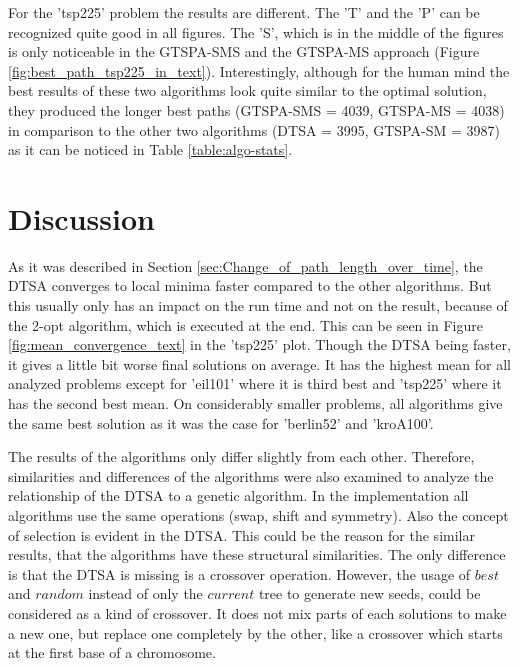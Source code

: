 \documentclass[12pt]{article}
\theoremstyle{plain}
\theoremstyle{definition}
\theoremstyle{remark}
\begin{document}
For the 'tsp225' problem the results are different. The 'T' and the 'P' can be recognized quite good in all figures.
The 'S', which is in the middle of the figures is only noticeable in the GTSPA-SMS and the GTSPA-MS approach (Figure \ref{fig:best_path_tsp225_in_text}).
Interestingly, although for the human mind the best results of these two algorithms look quite similar to the optimal solution, they produced the longer best paths (GTSPA-SMS = 4039, GTSPA-MS = 4038) in comparison to the other two algorithms (DTSA = 3995, GTSPA-SM = 3987) as it can be noticed in Table \ref{table:algo-stats}.

\section{Discussion}
\label{sec:discussion}

As it was described in Section \ref{sec:Change_of_path_length_over_time}, the DTSA converges to local minima faster compared to the other algorithms.
But this usually only has an impact on the run time and not on the result, because of the 2-opt algorithm, which is executed at the end.
This can be seen in Figure \ref{fig:mean_convergence_text} in the 'tsp225' plot.
Though the DTSA being faster, it gives a little bit worse final solutions on average.
It has the highest mean for all analyzed problems except for 'eil101' where it is third best and 'tsp225' where it has the second best mean.
On considerably smaller problems, all algorithms give the same best solution as it was the case for 'berlin52' and 'kroA100'.

The results of the algorithms only differ slightly from each other.
Therefore, similarities and differences of the algorithms were also examined to analyze the relationship of the DTSA to a genetic algorithm.
In the implementation all algorithms use the same operations (swap, shift and symmetry).
Also the concept of selection is evident in the DTSA.
This could be the reason for the similar results, that the algorithms have these structural similarities.
The only difference is that the DTSA is missing is a crossover operation.
However, the usage of $best$ and $random$ instead of only the $current$ tree to generate new seeds, could be considered as a kind of crossover.
It does not mix parts of each solutions to make a new one, but replace one completely by the other, like a crossover which starts at the first base of a chromosome.
\end{document}
